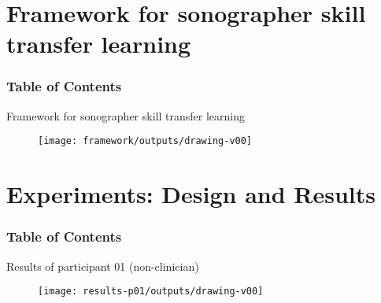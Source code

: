 {\section{Framework for sonographer skill transfer learning}
\begin{frame}
      \frametitle{Table of Contents}
      \tableofcontents[currentsection]
\end{frame}

{

\begin{frame}{Framework for sonographer skill transfer learning}{}

      \begin{figure}
        \centering
        \texttt{[image: framework/outputs/drawing-v00]}
      \end{figure}
\end{frame}
}



\section{Experiments: Design and Results}
\begin{frame}
      \frametitle{Table of Contents}
      \tableofcontents[currentsection]
  \end{frame}

{

\begin{frame}{Results of participant 01 (non-clinician)}{}

      \begin{figure}
        \centering
        \texttt{[image: results-p01/outputs/drawing-v00]}
      \end{figure}
\end{frame}
}


{

}}
